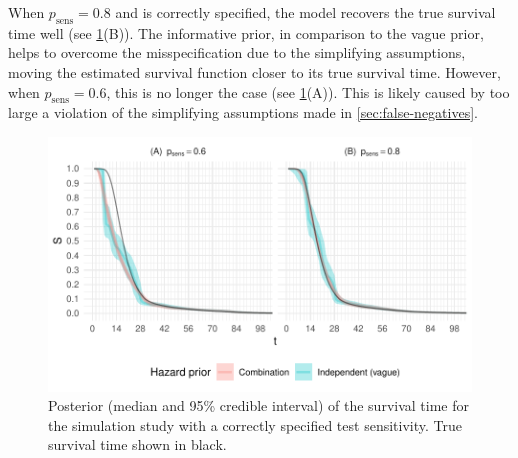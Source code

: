 \documentclass[12pt]{article}
\newcommand{\psens}{p_\text{sens}}
\begin{document}
When $\psens = 0.8$ and is correctly specified, the model recovers the true survival time well (see \cref{imperf-test:fig:constant-test-sensitivity}(B)).
The informative prior, in comparison to the vague prior, helps to overcome the misspecification due to the simplifying assumptions, moving the estimated survival function closer to its true survival time.
However, when $\psens = 0.6$, this is no longer the case (see \cref{imperf-test:fig:constant-test-sensitivity}(A)).
This is likely caused by too large a violation of the simplifying assumptions made in \cref{sec:false-negatives}.
\begin{figure}
  \includegraphics[width=\textwidth]{figures/output/sim-constant-sensitivity}
  \caption[Simulation study results with constant test sensitivity]{%
    Posterior (median and 95\% credible interval) of the survival time for the simulation study with a correctly specified test sensitivity.
    True survival time shown in black.
  }
  \label{imperf-test:fig:constant-test-sensitivity}
\end{figure}
\end{document}
